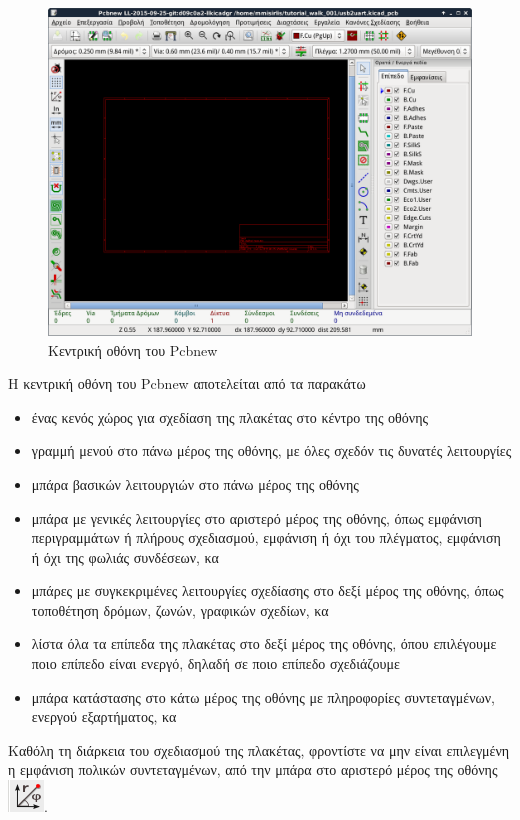 \documentclass[a4paper]{article}
\begin{document}
\begin{figure}
  \begin{center}
    \includegraphics[width=.9\textwidth]{img/pcb-wind-main.png}
    \caption{Κεντρική οθόνη του Pcbnew}
    \label{fig:pcb-wind-main}
  \end{center}
\end{figure}

H κεντρική οθόνη του Pcbnew αποτελείται από τα παρακάτω
\begin{itemize}
    \item ένας κενός χώρος για σχεδίαση της πλακέτας στο κέντρο της οθόνης
    \item γραμμή μενού στο πάνω μέρος της οθόνης, με όλες σχεδόν τις δυνατές λειτουργίες
    \item μπάρα βασικών λειτουργιών στο πάνω μέρος της οθόνης
    \item μπάρα με γενικές λειτουργίες στο αριστερό μέρος της οθόνης, όπως εμφάνιση περιγραμμάτων ή πλήρους σχεδιασμού, εμφάνιση ή όχι του πλέγματος, εμφάνιση ή όχι της φωλιάς συνδέσεων, κα
    \item μπάρες με συγκεκριμένες λειτουργίες σχεδίασης στο δεξί μέρος της οθόνης, όπως τοποθέτηση δρόμων, ζωνών, γραφικών σχεδίων, κα
    \item λίστα όλα τα επίπεδα της πλακέτας στο δεξί μέρος της οθόνης, όπου επιλέγουμε ποιο επίπεδο είναι ενεργό, δηλαδή σε ποιο επίπεδο σχεδιάζουμε
    \item μπάρα κατάστασης στο κάτω μέρος της οθόνης με πληροφορίες συντεταγμένων, ενεργού εξαρτήματος, κα
\end{itemize}

Καθόλη τη διάρκεια του σχεδιασμού της πλακέτας, φροντίστε να μην είναι επιλεγμένη η εμφάνιση πολικών συντεταγμένων, από την μπάρα στο αριστερό μέρος της οθόνης \includegraphics[scale=.5]{img/pcb-ico-coord.png}.
\end{document}
